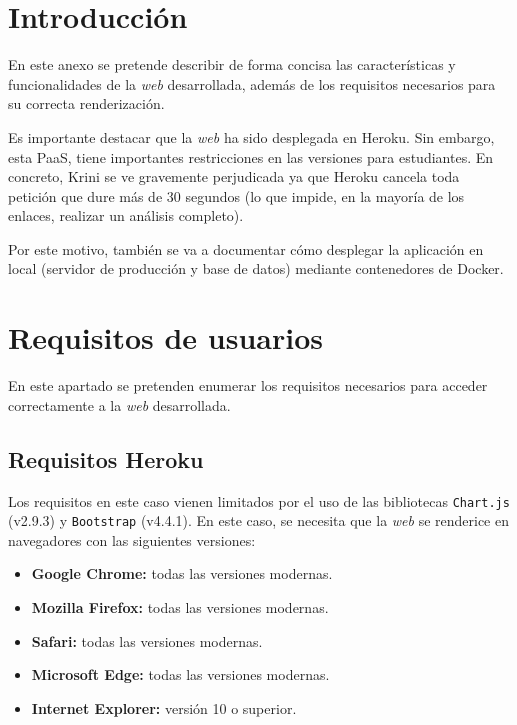 
\section{Introducción}

En este anexo se pretende describir de forma concisa las características y funcionalidades de la \textit{web} desarrollada, además de los requisitos necesarios para su correcta renderización.

Es importante destacar que la \textit{web} ha sido desplegada en Heroku. Sin embargo, esta PaaS, tiene importantes restricciones en las versiones para estudiantes. En concreto, Krini se ve gravemente perjudicada ya que Heroku cancela toda petición que dure más de 30 segundos (lo que impide, en la mayoría de los enlaces, realizar un análisis completo).

Por este motivo, también se va a documentar cómo desplegar la aplicación en local (servidor de producción y base de datos) mediante contenedores de Docker.

\section{Requisitos de usuarios}

En este apartado se pretenden enumerar los requisitos necesarios para acceder correctamente a la \textit{web} desarrollada.

\subsection{Requisitos Heroku}
\label{s-e:requisitos-heroku}

Los requisitos en este caso vienen limitados por el uso de las bibliotecas \texttt{Chart.js} (v2.9.3) y \texttt{Bootstrap} (v4.4.1). En este caso, se necesita que la \textit{web} se renderice en navegadores con las siguientes versiones:

\begin{itemize}
	\item \textbf{Google Chrome:} todas las versiones modernas.
	\item \textbf{Mozilla Firefox:} todas las versiones modernas.
	\item \textbf{Safari:} todas las versiones modernas.
	\item \textbf{Microsoft Edge:} todas las versiones modernas.
	\item \textbf{Internet Explorer:} versión 10 o superior.
\end{itemize}

